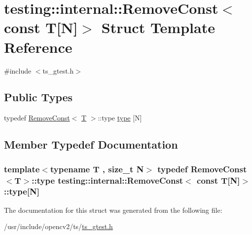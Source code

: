 \hypertarget{structtesting_1_1internal_1_1RemoveConst_3_01const_01T[N]_4}{\section{testing\-:\-:internal\-:\-:Remove\-Const$<$ const T\mbox{[}N\mbox{]}$>$ Struct Template Reference}
\label{structtesting_1_1internal_1_1RemoveConst_3_01const_01T[N]_4}
}


{\ttfamily \#include $<$ts\-\_\-gtest.\-h$>$}

\subsection*{Public Types}
\begin{DoxyCompactItemize}
\item 
typedef \hyperlink{structtesting_1_1internal_1_1RemoveConst}{Remove\-Const}$<$ \hyperlink{calib3d_8hpp_a3efb9551a871ddd0463079a808916717}{T} $>$\-::type \hyperlink{structtesting_1_1internal_1_1RemoveConst_3_01const_01T[N]_4_ac976b53cb5d031a120fafbe790650068}{type} \mbox{[}N\mbox{]}
\end{DoxyCompactItemize}


\subsection{Member Typedef Documentation}
\hypertarget{structtesting_1_1internal_1_1RemoveConst_3_01const_01T[N]_4_ac976b53cb5d031a120fafbe790650068}{
\subsubsection[{type}]{\setlength{\rightskip}{0pt plus 5cm}template$<$typename T , size\-\_\-t N$>$ typedef {\bf Remove\-Const}$<${\bf T}$>$\-::type {\bf testing\-::internal\-::\-Remove\-Const}$<$ const {\bf T}\mbox{[}N\mbox{]}$>$\-::type\mbox{[}N\mbox{]}}}\label{structtesting_1_1internal_1_1RemoveConst_3_01const_01T[N]_4_ac976b53cb5d031a120fafbe790650068}


The documentation for this struct was generated from the following file\-:\begin{DoxyCompactItemize}
\item 
/usr/include/opencv2/ts/\hyperlink{ts__gtest_8h}{ts\-\_\-gtest.\-h}\end{DoxyCompactItemize}
